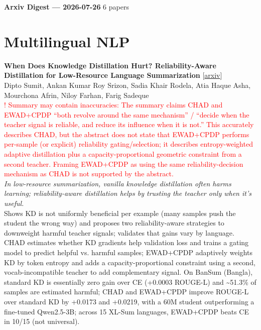 \documentclass[12pt,letterpaper]{article}
\begin{document}
{\footnotesize\textbf{Arxiv Digest --- 2026-07-26} \hfill 6 papers}

\smallskip

\section*{Multilingual NLP}

{\small\textbf{When Does Knowledge Distillation Hurt? Reliability-Aware Distillation for Low-Resource Language Summarization}} {\scriptsize[\href{https://arxiv.org/abs/2607.19956}{arxiv}]}\\
{\scriptsize Dipto Sumit, Ankan Kumar Roy Srizon, Sadia Khair Rodela, Atia Haque Asha, Mourchona Afrin, Niloy Farhan, Farig Sadeque}\\

{\scriptsize\textcolor{red}{! Summary may contain inaccuracies: The summary claims CHAD and EWAD+CPDP ``both revolve around the same mechanism'' / ``decide when the teacher signal is reliable, and reduce its influence when it is not.'' This accurately describes CHAD, but the abstract does not state that EWAD+CPDP performs per-sample (or explicit) reliability gating/selection; it describes entropy-weighted adaptive distillation plus a capacity-proportional geometric constraint from a second teacher. Framing EWAD+CPDP as using the same reliability-decision mechanism as CHAD is not supported by the abstract.}}\\[1pt]

{\small\textit{In low-resource summarization, vanilla knowledge distillation often harms learning; reliability-aware distillation helps by trusting the teacher only when it's useful.}}\\[1pt]
{\footnotesize Shows KD is not uniformly beneficial per example (many samples push the student the wrong way) and proposes two reliability-aware strategies to downweight harmful teacher signals; validates that gains vary by language. CHAD estimates whether KD gradients help validation loss and trains a gating model to predict helpful vs. harmful samples; EWAD+CPDP adaptively weights KD by token entropy and adds a capacity-proportional constraint using a second, vocab-incompatible teacher to add complementary signal. On BanSum (Bangla), standard KD is essentially zero gain over CE (+0.0003 ROUGE-L) and \textasciitilde{}51.3\% of samples are estimated harmful; CHAD and EWAD+CPDP improve ROUGE-L over standard KD by +0.0173 and +0.0219, with a 60M student outperforming a fine-tuned Qwen2.5-3B; across 15 XL-Sum languages, EWAD+CPDP beats CE in 10/15 (not universal).}
\end{document}
